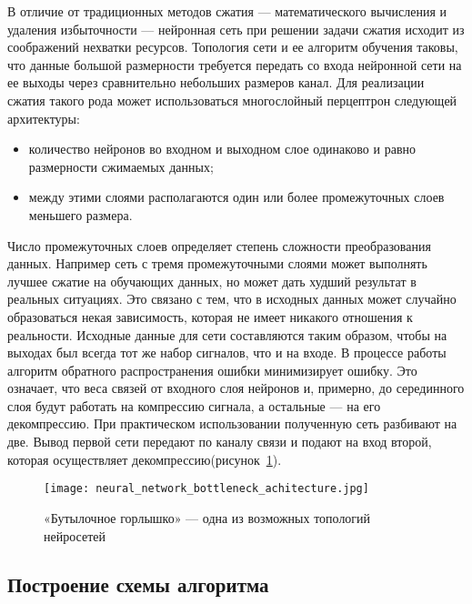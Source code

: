 В отличие от традиционных методов сжатия --- математического вычисления и удаления избыточности --- нейронная сеть при
решении задачи сжатия исходит из соображений нехватки ресурсов. Топология сети и ее алгоритм обучения таковы,
что данные большой размерности требуется передать со входа нейронной сети на ее выходы через сравнительно небольших размеров канал.
Для реализации сжатия такого рода может использоваться многослойный перцептрон следующей архитектуры:
\begin{itemize}
  \item количество нейронов во входном и выходном слое одинаково и равно размерности сжимаемых данных;
  \item между этими слоями располагаются один или более промежуточных слоев меньшего размера.
\end{itemize}
Число промежуточных слоев определяет степень сложности преобразования данных. Например сеть с тремя промежуточными слоями
может выполнять лучшее сжатие на обучающих данных, но может дать худший результат в реальных ситуациях. Это связано с тем,
что в исходных данных может случайно образоваться некая зависимость, которая не имеет никакого отношения к реальности.
Исходные данные для сети составляются таким образом, чтобы на выходах был всегда тот же набор сигналов, что и на входе.
В процессе работы алгоритм обратного распространения ошибки минимизирует ошибку. Это означает, что веса связей от входного слоя нейронов и,
примерно, до серединного слоя будут работать на компрессию сигнала, а остальные --- на его декомпрессию.
При практическом использовании полученную сеть разбивают на две. Вывод первой сети передают по каналу связи и подают на вход второй,
которая осуществляет декомпрессию(рисунок~\ref{fig:bottleneck_achitecture}).

\begin{figure}[ht]
\centering
  \texttt{[image: neural\_network\_bottleneck\_achitecture.jpg]}
  \caption{ «Бутылочное горлышко» --- одна из возможных топологий нейросетей }
  \label{fig:bottleneck_achitecture}
\end{figure}

\subsection{Построение схемы алгоритма}
\label{sub:research:algorithm}

